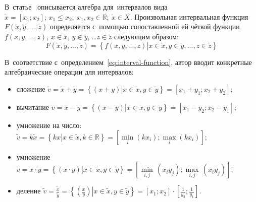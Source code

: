 В~статье~\cite{Levin} описывается алгебра для~интервалов вида $\tilde{x}=\left[ {{x}_{1}};{{x}_{2}} \right];\,{{x}_{1}}\le {{x}_{2}};\ x_1, x_2\in \mathbb{R};\ \tilde{x}\in X$. Произвольная интервальная функция $F\left( \tilde{x},\tilde{y},...,\tilde{z} \right)$ определяется с~помощью сопоставленной ей чёткой функции $f\left( x,y,\ldots,z \right)$, $x\in \tilde{x}$, $y\in \tilde{y}$, …$z\in \tilde{z}$ следующим образом:
\begin{equation}
\label{eq:interval-function}
	F\left( \tilde{x},\tilde{y},...,\tilde{z} \right)=\left\{ f\left( x,y,...,z \right)\left| x\in \tilde{x},y\in \tilde{y},...,z\in \tilde{z} \right. \right\}
\end{equation}

В~соответствие с~определением~\eqref{eq:interval-function}, автор вводит конкретные алгебраические операции для интервалов:
\begin{itemize}
	\item сложение $\tilde{v}=\tilde{x}+\tilde{y}=\left\{ \left( x+y \right)\left| x\in \tilde{x},y\in \tilde{y} \right. \right\}=\left[ {{x}_{1}}+{{y}_{1}};{{x}_{2}}+{{y}_{2}} \right]$;
	\item вычитание $\tilde{v}=\tilde{x}-\tilde{y}=\left\{ \left( x-y \right)\left| x\in \tilde{x},y\in \tilde{y} \right. \right\}=\left[ {{x}_{1}}-{{y}_{2}};{{x}_{2}}-{{y}_{1}} \right]$;
	\item умножение на число: $\tilde{v}=k\tilde{x}=\left\{ kx\left| x\in \tilde{x},k\in \mathbb{R} \right. \right\}=\left[\underset{i}{\mathop {\min}} \left( kx_i \right); \underset{i}{\mathop {\max}} \left( kx_i \right) \right]$;
	
	\item умножение $\tilde{v}=\tilde{x}\cdot \tilde{y}=\left\{ \left( x\cdot y \right)\left| x\in \tilde{x},y\in \tilde{y} \right. \right\}=\left[ \underset{i,j}{\mathop{\min }}\,\left( {{x}_{i}}{{y}_{j}} \right);\underset{i,j}{\mathop{\max }}\,\left( {{x}_{i}}{{y}_{j}} \right) \right]$;
	\item деление $\displaystyle \tilde{v}=\frac{\tilde x}{\tilde y}=\left\{ \left. \left( \frac{x}{y} \right) \right|x\in \tilde{x},y\in \tilde{y} \right\}=\left[ {{x}_{1}};{{x}_{2}} \right]\cdot \left[ \frac{1}{{{y}_{2}}};\frac{1}{{{y}_{1}}} \right]$.
\end{itemize}


